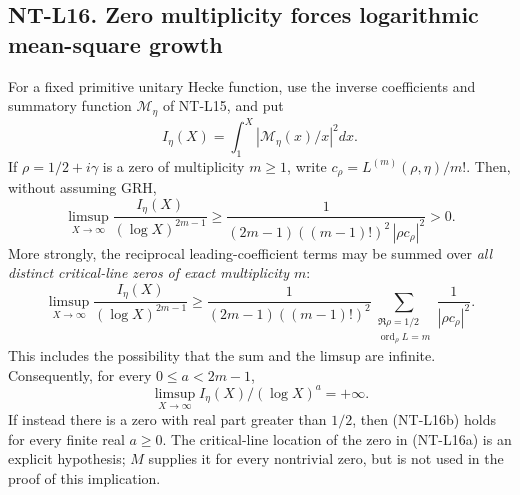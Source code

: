 \documentclass[11pt,a4paper]{article}
\begin{document}
\subsection*{NT-L16. Zero multiplicity forces logarithmic mean-square growth}
For a fixed primitive unitary Hecke function, use the inverse coefficients
and summatory function $\mathcal M_\eta$ of NT-L15, and put
\[
 I_\eta(X)=\int_1^X|\mathcal M_\eta(x)/x|^2dx.
\]
If $\rho=1/2+i\gamma$ is a zero of multiplicity $m\ge1$, write
$c_\rho=L^{(m)}(\rho,\eta)/m!$. Then, without assuming GRH,
\[
 \limsup_{X\to\infty}\frac{I_\eta(X)}{(\log X)^{2m-1}}
       \ge\frac1{(2m-1)((m-1)!)^2\,|\rho c_\rho|^2}>0.
                                                        \tag{NT-L16a}
\]
More strongly, the reciprocal leading-coefficient terms may be summed
over \emph{all distinct critical-line zeros of exact multiplicity $m$}:
\[
 \limsup_{X\to\infty}\frac{I_\eta(X)}{(\log X)^{2m-1}}
 \ge\frac1{(2m-1)((m-1)!)^2}
   \sum_{\substack{\Re\rho=1/2\\ \operatorname{ord}_\rho L=m}}
            \frac1{|\rho c_\rho|^2}.                    \tag{NT-L16a'}
\]
This includes the possibility that the sum and the limsup are infinite.
Consequently, for every $0\le a<2m-1$,
\[
 \limsup_{X\to\infty}I_\eta(X)/(\log X)^a=+\infty.
                                                        \tag{NT-L16b}
\]
If instead there is a zero with real part greater than $1/2$, then
(NT-L16b) holds for every finite real $a\ge0$.
The critical-line location of the zero in (NT-L16a) is an explicit
hypothesis; $M$ supplies it for every nontrivial zero, but is not
used in the proof of this implication.
\end{document}
